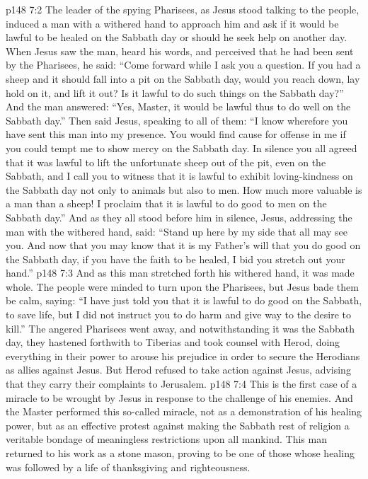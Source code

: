 \vs p148 7:2 The leader of the spying Pharisees, as Jesus stood talking to the people, induced a man with a withered hand to approach him and ask if it would be lawful to be healed on the Sabbath day or should he seek help on another day. When Jesus saw the man, heard his words, and perceived that he had been sent by the Pharisees, he said: \textcolor{ubdarkred}{“Come forward while I ask you a question. If you had a sheep and it should fall into a pit on the Sabbath day, would you reach down, lay hold on it, and lift it out? Is it lawful to do such things on the Sabbath day?”} And the man answered: “Yes, Master, it would be lawful thus to do well on the Sabbath day.” Then said Jesus, speaking to all of them: \textcolor{ubdarkred}{“I know wherefore you have sent this man into my presence. You would find cause for offense in me if you could tempt me to show mercy on the Sabbath day. In silence you all agreed that it was lawful to lift the unfortunate sheep out of the pit, even on the Sabbath, and I call you to witness that it is lawful to exhibit loving\hyp{}kindness on the Sabbath day not only to animals but also to men. How much more valuable is a man than a sheep! I proclaim that it is lawful to do good to men on the Sabbath day.”} And as they all stood before him in silence, Jesus, addressing the man with the withered hand, said: \textcolor{ubdarkred}{“Stand up here by my side that all may see you. And now that you may know that it is my Father’s will that you do good on the Sabbath day, if you have the faith to be healed, I bid you stretch out your hand.”}\plusone
\vs p148 7:3 And as this man stretched forth his withered hand, it was made whole. The people were minded to turn upon the Pharisees, but Jesus bade them be calm, saying: \textcolor{ubdarkred}{“I have just told you that it is lawful to do good on the Sabbath, to save life, but I did not instruct you to do harm and give way to the desire to kill.”} The angered Pharisees went away, and notwithstanding it was the Sabbath day, they hastened forthwith to Tiberias and took counsel with Herod, doing everything in their power to arouse his prejudice in order to secure the Herodians as allies against Jesus. But Herod refused to take action against Jesus, advising that they carry their complaints to Jerusalem.
\vs p148 7:4 This is the first case of a miracle to be wrought by Jesus in response to the challenge of his enemies. And the Master performed this so\hyp{}called miracle, not as a demonstration of his healing power, but as an effective protest against making the Sabbath rest of religion a veritable bondage of meaningless restrictions upon all mankind. This man returned to his work as a stone mason, proving to be one of those whose healing was followed by a life of thanksgiving and righteousness.
